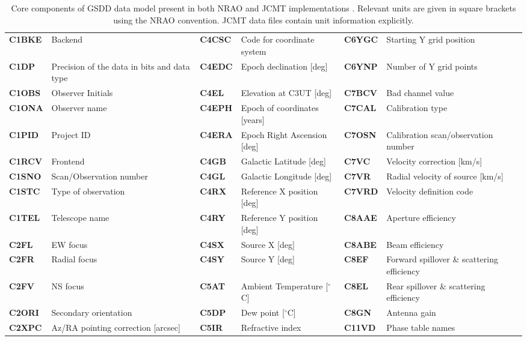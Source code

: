 \documentclass[final,authoryear,5p,times,twocolumn]{elsarticle}
\begin{document}
\begin{table}[!ht]
\centering
\caption{Core components of GSDD data model present in both NRAO and
  JCMT implementations \citep{tcus5}. Relevant units are given in square brackets
  using the NRAO convention. JCMT data files contain unit information explicitly.}
\label{tab:core}
\begin{tabular}{|lp{1.5in}|lp{1.5in}|lp{1.5in}|}
\hline
\textbf{C1BKE} & Backend & \textbf{C4CSC} & Code for coordinate system & \textbf{C6YGC} & Starting Y grid position \\
\textbf{C1DP} & Precision of the data in bits and data type & \textbf{C4EDC} & Epoch declination [deg] & \textbf{C6YNP} & Number of Y grid points \\
\textbf{C1OBS} & Observer Initials & \textbf{C4EL} & Elevation at C3UT [deg] & \textbf{C7BCV} & Bad channel value \\
\textbf{C1ONA} & Observer name & \textbf{C4EPH} & Epoch of coordinates [years]& \textbf{C7CAL} & Calibration type \\
\textbf{C1PID} & Project ID & \textbf{C4ERA} & Epoch Right Ascension [deg]& \textbf{C7OSN} & Calibration scan/observation number \\
\textbf{C1RCV} & Frontend & \textbf{C4GB} & Galactic Latitude [deg]& \textbf{C7VC} & Velocity correction [km/s]\\
\textbf{C1SNO} & Scan/Observation number & \textbf{C4GL} & Galactic Longitude [deg]& \textbf{C7VR} & Radial velocity of source [km/s]\\
\textbf{C1STC} & Type of observation & \textbf{C4RX} & Reference X position [deg]& \textbf{C7VRD} & Velocity definition code \\
\textbf{C1TEL} & Telescope name & \textbf{C4RY} & Reference Y position [deg]& \textbf{C8AAE} & Aperture efficiency \\
\textbf{C2FL} & EW focus & \textbf{C4SX} & Source X [deg]& \textbf{C8ABE} & Beam efficiency \\
\textbf{C2FR} & Radial focus & \textbf{C4SY} & Source Y [deg]& \textbf{C8EF} & Forward spillover \& scattering efficiency \\
\textbf{C2FV} & NS focus & \textbf{C5AT} & Ambient Temperature [$^\circ$C]& \textbf{C8EL} & Rear spillover \& scattering efficiency \\
\textbf{C2ORI} & Secondary orientation & \textbf{C5DP} & Dew point [$^\circ$C]& \textbf{C8GN} & Antenna gain \\
\textbf{C2XPC} & Az/RA pointing correction [arcsec] & \textbf{C5IR} & Refractive index & \textbf{C11VD} & Phase table names \\

\end{tabular}
\end{table}
\end{document}
